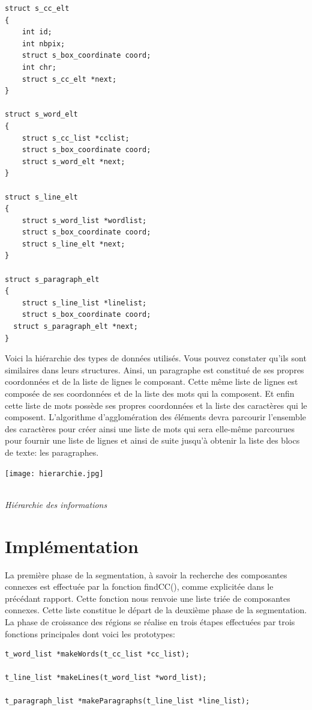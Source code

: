 \documentclass[a4paper,12pt]{report}
\begin{document}
\begin{lstlisting}
struct s_cc_elt
{
    int id;
    int nbpix;
    struct s_box_coordinate coord;
    int chr;
    struct s_cc_elt *next;
}

struct s_word_elt
{
    struct s_cc_list *cclist;
    struct s_box_coordinate coord;
    struct s_word_elt *next;
}

struct s_line_elt
{
    struct s_word_list *wordlist;
    struct s_box_coordinate coord;
    struct s_line_elt *next;
}

struct s_paragraph_elt
{
    struct s_line_list *linelist;
    struct s_box_coordinate coord;
  struct s_paragraph_elt *next;
}
\end{lstlisting}


Voici la hiérarchie des types de données utilisés. Vous pouvez constater qu'ils sont
similaires dans leurs structures. Ainsi, un paragraphe est constitué de ses propres
coordonnées et de la liste de lignes le composant. Cette même liste de lignes est composée
de ses coordonnées et de la liste des mots qui la composent. Et enfin cette liste de mots
possède ses propres coordonnées et la liste des caractères qui le composent. L'algorithme
d'agglomération des éléments devra parcourir l'ensemble des caractères pour
créer ainsi une liste de mots qui sera elle-même parcourues pour fournir une liste de lignes
et ainsi de suite jusqu'à obtenir la liste des blocs de texte: les paragraphes.

\begin{center}
  \texttt{[image: hierarchie.jpg]}
  \caption{\\\emph{Hi\'erarchie des informations}}
\end{center}



\section{Impl\'ementation}

La première phase de la segmentation, à savoir la recherche des composantes connexes
est effectuée par la fonction findCC(), comme explicitée dans le précédant rapport. Cette
fonction nous renvoie une liste triée de composantes connexes. Cette liste constitue le
départ de la deuxième phase de la segmentation. La phase de croissance des régions se
réalise en trois étapes effectuées par trois fonctions principales dont voici les prototypes:

\begin{lstlisting}
t_word_list *makeWords(t_cc_list *cc_list);

t_line_list *makeLines(t_word_list *word_list);

t_paragraph_list *makeParagraphs(t_line_list *line_list);
\end{lstlisting}
\end{document}
